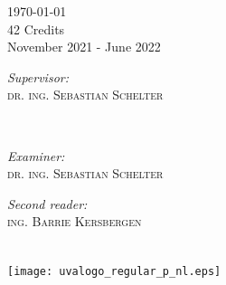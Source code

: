 \documentclass[12pt]{report}
\begin{document}
\begin{titlepage}
{\Large \today}\\[1cm]



42 Credits\\ %

November 2021 - June 2022\\[1cm]%






\begin{minipage}[t]{0.4\textwidth}

\begin{flushleft} \large

\emph{Supervisor:} \\

\textsc{dr. ing. Sebastian Schelter }\\

\end{flushleft}

\end{minipage}

~

\begin{minipage}[t]{0.4\textwidth}

\begin{flushright} \large

\emph{Examiner:} \\

\textsc{dr. ing. Sebastian Schelter }\\

\vspace{0.5cm}

\emph{Second reader:} \\

\textsc{ing. Barrie Kersbergen}\\

\end{flushright}

\end{minipage}\\[2cm]









\texttt{[image: uvalogo\_regular\_p\_nl.eps]}

 




\vfill

\end{titlepage}
\end{document}
